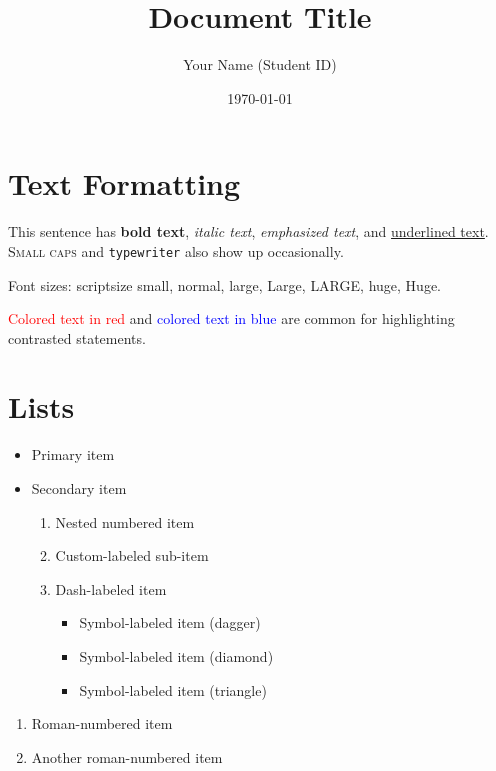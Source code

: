 \documentclass{article}
\title{Document Title}
\author{Your Name (Student ID)}
\date{\today}
\begin{document}
\maketitle

\section{Text Formatting}

This sentence has \textbf{bold text}, \textit{italic text}, \emph{emphasized text},
and \underline{underlined text}. \textsc{Small caps} and \texttt{typewriter} also
show up occasionally.

Font sizes: {\scriptsize scriptsize} {\small small}, {\normalsize normal}, {\large large}, {\Large Large},
{\LARGE LARGE}, {\huge huge}, {\Huge Huge}.

\textcolor{red}{Colored text in red} and \textcolor{blue}{colored text in blue}
are common for highlighting contrasted statements.

\section{Lists}

\begin{itemize}
    \item Primary item
    \item Secondary item
        \begin{enumerate}
            \item Nested numbered item
            \item[(a)] Custom-labeled sub-item \\ %
            \item[-] Dash-labeled item
                \begin{itemize}
                    \item[$\dagger$] Symbol-labeled item (dagger)
                    \item[$\diamond$] Symbol-labeled item (diamond)
                    \item[$\rhd$] Symbol-labeled item (triangle)
                \end{itemize}
        \end{enumerate}
\end{itemize}

\begin{enumerate}[label={(\Roman*)}]
    \item Roman-numbered item
    \item Another roman-numbered item
\end{enumerate}
\end{document}
